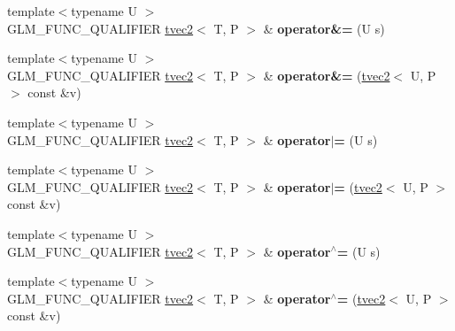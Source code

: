 \begin{DoxyCompactItemize}
\item 
\hypertarget{structglm_1_1detail_1_1tvec2_a33ed3ceda999a3046030a1a918b96ddc}{{\footnotesize template$<$typename U $>$ }\\G\-L\-M\-\_\-\-F\-U\-N\-C\-\_\-\-Q\-U\-A\-L\-I\-F\-I\-E\-R \hyperlink{structglm_1_1detail_1_1tvec2}{tvec2}$<$ T, P $>$ \& {\bfseries operator\&=} (U s)}\label{structglm_1_1detail_1_1tvec2_a33ed3ceda999a3046030a1a918b96ddc}

\item 
\hypertarget{structglm_1_1detail_1_1tvec2_ae1d8d56ac7b3d9278f9348d89f3ff96e}{{\footnotesize template$<$typename U $>$ }\\G\-L\-M\-\_\-\-F\-U\-N\-C\-\_\-\-Q\-U\-A\-L\-I\-F\-I\-E\-R \hyperlink{structglm_1_1detail_1_1tvec2}{tvec2}$<$ T, P $>$ \& {\bfseries operator\&=} (\hyperlink{structglm_1_1detail_1_1tvec2}{tvec2}$<$ U, P $>$ const \&v)}\label{structglm_1_1detail_1_1tvec2_ae1d8d56ac7b3d9278f9348d89f3ff96e}

\item 
\hypertarget{structglm_1_1detail_1_1tvec2_aaeea420df82cbb94b83d702248f1071d}{{\footnotesize template$<$typename U $>$ }\\G\-L\-M\-\_\-\-F\-U\-N\-C\-\_\-\-Q\-U\-A\-L\-I\-F\-I\-E\-R \hyperlink{structglm_1_1detail_1_1tvec2}{tvec2}$<$ T, P $>$ \& {\bfseries operator$\vert$=} (U s)}\label{structglm_1_1detail_1_1tvec2_aaeea420df82cbb94b83d702248f1071d}

\item 
\hypertarget{structglm_1_1detail_1_1tvec2_a452fee00c19e71d024421a21bb4f3854}{{\footnotesize template$<$typename U $>$ }\\G\-L\-M\-\_\-\-F\-U\-N\-C\-\_\-\-Q\-U\-A\-L\-I\-F\-I\-E\-R \hyperlink{structglm_1_1detail_1_1tvec2}{tvec2}$<$ T, P $>$ \& {\bfseries operator$\vert$=} (\hyperlink{structglm_1_1detail_1_1tvec2}{tvec2}$<$ U, P $>$ const \&v)}\label{structglm_1_1detail_1_1tvec2_a452fee00c19e71d024421a21bb4f3854}

\item 
\hypertarget{structglm_1_1detail_1_1tvec2_a0c67c4ec90c7f05f1e509f77c78cc794}{{\footnotesize template$<$typename U $>$ }\\G\-L\-M\-\_\-\-F\-U\-N\-C\-\_\-\-Q\-U\-A\-L\-I\-F\-I\-E\-R \hyperlink{structglm_1_1detail_1_1tvec2}{tvec2}$<$ T, P $>$ \& {\bfseries operator$^\wedge$=} (U s)}\label{structglm_1_1detail_1_1tvec2_a0c67c4ec90c7f05f1e509f77c78cc794}

\item 
\hypertarget{structglm_1_1detail_1_1tvec2_a78b9cb7b25ea115e5403e0e83692249a}{{\footnotesize template$<$typename U $>$ }\\G\-L\-M\-\_\-\-F\-U\-N\-C\-\_\-\-Q\-U\-A\-L\-I\-F\-I\-E\-R \hyperlink{structglm_1_1detail_1_1tvec2}{tvec2}$<$ T, P $>$ \& {\bfseries operator$^\wedge$=} (\hyperlink{structglm_1_1detail_1_1tvec2}{tvec2}$<$ U, P $>$ const \&v)}\label{structglm_1_1detail_1_1tvec2_a78b9cb7b25ea115e5403e0e83692249a}


\end{DoxyCompactItemize}
